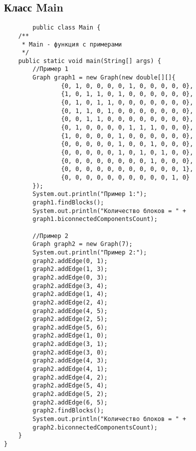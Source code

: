 	\subsection{Класс Main}
	\begin{verbatim}
	    public class Main {
    /**
     * Main - функция с примерами
     */
    public static void main(String[] args) {
        //Пример 1
        Graph graph1 = new Graph(new double[][]{
                {0, 1, 0, 0, 0, 0, 1, 0, 0, 0, 0, 0},
                {1, 0, 1, 1, 0, 1, 0, 0, 0, 0, 0, 0},
                {0, 1, 0, 1, 1, 0, 0, 0, 0, 0, 0, 0},
                {0, 1, 1, 0, 1, 0, 0, 0, 0, 0, 0, 0},
                {0, 0, 1, 1, 0, 0, 0, 0, 0, 0, 0, 0},
                {0, 1, 0, 0, 0, 0, 1, 1, 1, 0, 0, 0},
                {1, 0, 0, 0, 0, 1, 0, 0, 0, 0, 0, 0},
                {0, 0, 0, 0, 0, 1, 0, 0, 1, 0, 0, 0},
                {0, 0, 0, 0, 0, 1, 0, 1, 0, 1, 0, 0},
                {0, 0, 0, 0, 0, 0, 0, 0, 1, 0, 0, 0},
                {0, 0, 0, 0, 0, 0, 0, 0, 0, 0, 0, 1},
                {0, 0, 0, 0, 0, 0, 0, 0, 0, 0, 1, 0}
        });
        System.out.println("Пример 1:");
        graph1.findBlocks();
        System.out.println("Количество блоков = " +
        graph1.biconnectedComponentsCount);

        //Пример 2
        Graph graph2 = new Graph(7);
        System.out.println("Пример 2:");
        graph2.addEdge(0, 1);
        graph2.addEdge(1, 3);
        graph2.addEdge(0, 3);
        graph2.addEdge(3, 4);
        graph2.addEdge(1, 4);
        graph2.addEdge(2, 4);
        graph2.addEdge(4, 5);
        graph2.addEdge(2, 5);
        graph2.addEdge(5, 6);
        graph2.addEdge(1, 0);
        graph2.addEdge(3, 1);
        graph2.addEdge(3, 0);
        graph2.addEdge(4, 3);
        graph2.addEdge(4, 1);
        graph2.addEdge(4, 2);
        graph2.addEdge(5, 4);
        graph2.addEdge(5, 2);
        graph2.addEdge(6, 5);
        graph2.findBlocks();
        System.out.println("Количество блоков = " +
        graph2.biconnectedComponentsCount);
    }
}
	\end{verbatim}